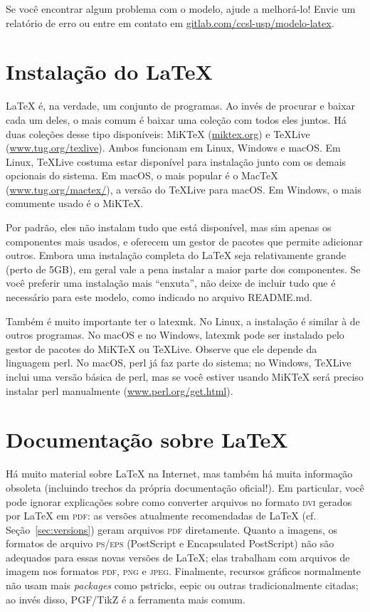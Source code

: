 Se você encontrar algum problema com o modelo, ajude a melhorá-lo!
Envie um relatório de erro ou entre em contato em
\url{gitlab.com/ccsl-usp/modelo-latex}.

\section{Instalação do \LaTeX{}}
\label{sec:install}

\LaTeX{} é, na verdade, um conjunto de programas. Ao invés de procurar e
baixar cada um deles, o mais comum é baixar uma coleção com todos eles juntos.
Há duas coleções desse tipo disponíveis: MiK\TeX{} (\url{miktex.org}) e
\TeX{}Live (\url{www.tug.org/texlive}). Ambos funcionam em Linux, Windows e
macOS. Em Linux, \TeX{}Live costuma estar disponível para instalação junto
com os demais opcionais do sistema. Em macOS, o mais popular é o Mac\TeX{}
(\url{www.tug.org/mactex/}), a versão do \TeX{}Live para macOS. Em Windows,
o mais comumente usado é o MiK\TeX{}.

Por padrão, eles não instalam tudo que está disponível, mas sim apenas os
componentes mais usados, e oferecem um gestor de pacotes que permite adicionar
outros. Embora uma instalação completa do \LaTeX{} seja relativamente grande
(perto de 5GB), em geral vale a pena instalar a maior parte dos componentes.
Se você preferir uma instalação mais ``enxuta'', não deixe de incluir tudo
que é necessário para este modelo, como indicado no arquivo README.md.

Também é muito importante ter o \textsf{latexmk}. No Linux, a instalação
é similar à de outros programas. No macOS e no Windows, \textsf{latexmk}
pode ser instalado pelo gestor de pacotes do MiK\TeX{} ou \TeX{}Live.
Observe que ele depende da linguagem \textsf{perl}. No macOS,
\textsf{perl} já faz parte do sistema; no Windows, \TeX{}Live inclui
uma versão básica de perl, mas se você estiver usando MiK\TeX{} será
preciso instalar \textsf{perl} manualmente (\url{www.perl.org/get.html}).

\section{Documentação sobre \LaTeX}
\label{sec:docs}

Há muito material sobre \LaTeX{} na Internet, mas também há muita informação
obsoleta (incluindo trechos da própria documentação oficial!). Em particular,
você pode ignorar explicações sobre como converter arquivos no formato
\textsc{dvi} gerados por \LaTeX{} em \textsc{pdf}: as versões atualmente
recomendadas de \LaTeX{} (cf. Seção~\ref{sec:versions}) geram arquivos
\textsc{pdf} diretamente. Quanto a imagens, os formatos de arquivo
\textsc{ps/eps} (PostScript e Encapsulated PostScript) não são adequados
para essas novas versões de \LaTeX{}; elas trabalham com arquivos de imagem
nos formatos \textsc{pdf}, \textsc{png} e \textsc{jpeg}. Finalmente,
recursos gráficos normalmente não usam mais \textit{packages} como
\textsf{pstricks}, \textsf{eepic} ou outras tradicionalmente citadas;
ao invés disso, \textsf{PGF/TikZ} é a ferramenta mais comum.

